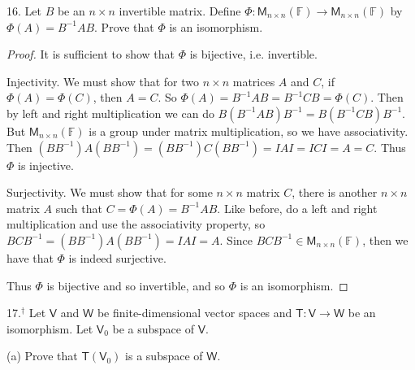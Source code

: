 \documentclass[11pt]{article}
\begin{document}
16. Let $B$ be an $n\times n$ invertible matrix. Define $\Phi : \mathsf{M}_{n\times n}(\mathbb{F})\to \mathsf{M}_{n\times n}(\mathbb{F})$ by $\Phi(A) = B^{-1}AB$. Prove that $\Phi$ is an isomorphism.

\begin{proof}
    It is sufficient to show that $\Phi$ is bijective, i.e. invertible.

    Injectivity. We must show that for two $n\times n$ matrices $A$ and $C$, if $\Phi(A) = \Phi(C)$, then $A=C$. So $\Phi(A) = B^{-1}AB = B^{-1}CB = \Phi(C)$. Then by left and right multiplication we can do $B(B^{-1}AB)B^{-1} = B(B^{-1}CB)B^{-1}$. But $\mathsf{M}_{n\times n}(\mathbb{F})$ is a group under matrix multiplication, so we have associativity. Then $(BB^{-1})A(BB^{-1}) = (BB^{-1})C(BB^{-1}) = IAI = ICI = A = C$. Thus $\Phi$ is injective.

    Surjectivity. We must show that for some $n\times n$ matrix $C$, there is another $n\times n$ matrix $A$ such that $C = \Phi(A) = B^{-1}AB$. Like before, do a left and right multiplication and use the associativity property, so $BCB^{-1} = (BB^{-1})A(BB^{-1}) = IAI = A$. Since $BCB^{-1} \in \mathsf{M}_{n\times n}(\mathbb{F})$, then we have that $\Phi$ is indeed surjective.

    Thus $\Phi$ is bijective and so invertible, and so $\Phi$ is an isomorphism.
\end{proof}

17.$^\dagger$ Let $\mathsf{V}$ and $\mathsf{W}$ be finite-dimensional vector spaces and $\mathsf{T} : \mathsf{V} \to \mathsf{W}$ be an isomorphism. Let $\mathsf{V}_0$ be a subspace of $\mathsf{V}$.

(a) Prove that $\mathsf{T}(\mathsf{V}_0)$ is a subspace of $\mathsf{W}$.
\end{document}
